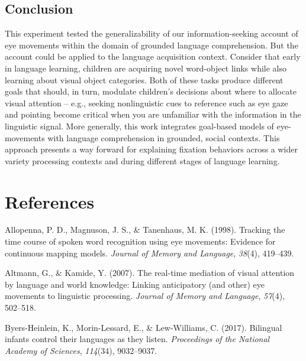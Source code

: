 \documentclass[english,floatsintext,man]{apa6}
\begin{document}
\hypertarget{conclusion}{%
\subsection{Conclusion}\label{conclusion}}

This experiment tested the generalizability of our information-seeking
account of eye movements within the domain of grounded language
comprehension. But the account could be applied to the language
acquisition context. Consider that early in language learning, children
are acquiring novel word-object links while also learning about visual
object categories. Both of these tasks produce different goals that
should, in turn, modulate children's decisions about where to allocate
visual attention -- e.g., seeking nonlinguistic cues to reference such
as eye gaze and pointing become critical when you are unfamiliar with
the information in the linguistic signal. More generally, this work
integrates goal-based models of eye-movements with language
comprehension in grounded, social contexts. This approach presents a way
forward for explaining fixation behaviors across a wider variety
processing contexts and during different stages of language learning.

\newpage

\hypertarget{references}{%
\section{References}\label{references}}

\setlength{\parindent}{-0.5in}
\setlength{\leftskip}{0.5in}

\hypertarget{refs}{}
\leavevmode\hypertarget{ref-allopenna1998tracking}{}%
Allopenna, P. D., Magnuson, J. S., \& Tanenhaus, M. K. (1998). Tracking
the time course of spoken word recognition using eye movements: Evidence
for continuous mapping models. \emph{Journal of Memory and Language},
\emph{38}(4), 419--439.

\leavevmode\hypertarget{ref-altmann2007real}{}%
Altmann, G., \& Kamide, Y. (2007). The real-time mediation of visual
attention by language and world knowledge: Linking anticipatory (and
other) eye movements to linguistic processing. \emph{Journal of Memory
and Language}, \emph{57}(4), 502--518.

\leavevmode\hypertarget{ref-byers2017bilingual}{}%
Byers-Heinlein, K., Morin-Lessard, E., \& Lew-Williams, C. (2017).
Bilingual infants control their languages as they listen.
\emph{Proceedings of the National Academy of Sciences}, \emph{114}(34),
9032--9037.
\end{document}
